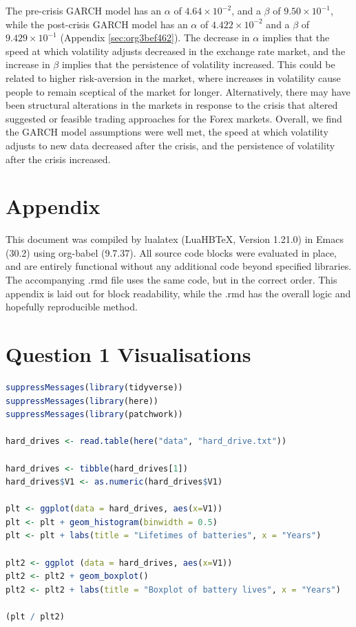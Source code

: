 \documentclass[a4paper]{article}
\begin{document}
The pre-crisis GARCH model has an \(\alpha\) of \(4.64 \times 10^{-2}\), and a \(\beta\) of \(9.50 \times 10^{-1}\), while the post-crisis GARCH model has an \(\alpha\) of \(4.422 \times 10^{-2}\) and a \(\beta\) of \(9.429 \times 10^{-1}\) (Appendix \ref{sec:org3bef462}). The decrease in \(\alpha\) implies that the speed at which volatility adjusts decreased in the exchange rate market, and the increase in \(\beta\) implies that the persistence of volatility increased. This could be related to higher risk-aversion in the market, where increases in volatility cause people to remain sceptical of the market for longer. Alternatively, there may have been structural alterations in the markets in response to the crisis that altered suggested or feasible trading approaches for the Forex markets. Overall, we find the GARCH model assumptions were well met, the speed at which volatility adjusts to new data decreased after the crisis, and the persistence of volatility after the crisis increased. 


\newpage

\appendix
\section{Appendix}
\label{sec:org848d60a}
This document was compiled by lualatex (LuaHBTeX, Version 1.21.0) in Emacs (30.2) using org-babel (9.7.37). All source code blocks were evaluated in place, and are entirely functional without any additional code beyond specified libraries. The accompanying .rmd file uses the same code, but in the correct order. This appendix is laid out for block readability, while the .rmd has the overall logic and hopefully reproducible method.
\section{Question 1 Visualisations}
\label{sec:orga3c4d6e}
\begin{lstlisting}[language=r,label=lst:org95e570b,caption={Question 1: Visualisation of hard drive lifetimes},captionpos=b,numbers=none]
suppressMessages(library(tidyverse))
suppressMessages(library(here))
suppressMessages(library(patchwork))

hard_drives <- read.table(here("data", "hard_drive.txt"))

hard_drives <- tibble(hard_drives[1])
hard_drives$V1 <- as.numeric(hard_drives$V1)

plt <- ggplot(data = hard_drives, aes(x=V1))
plt <- plt + geom_histogram(binwidth = 0.5)
plt <- plt + labs(title = "Lifetimes of batteries", x = "Years")

plt2 <- ggplot (data = hard_drives, aes(x=V1))
plt2 <- plt2 + geom_boxplot()
plt2 <- plt2 + labs(title = "Boxplot of battery lives", x = "Years")

(plt / plt2) 
\end{lstlisting}
\end{document}
